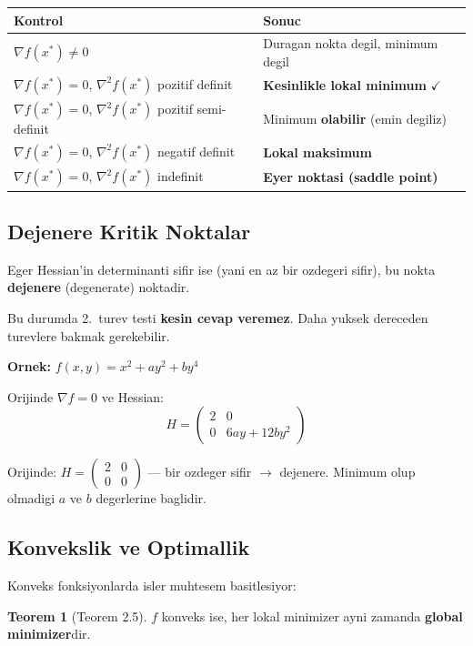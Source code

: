 \documentclass[12pt,a4paper]{article}
\theoremstyle{definition}
\newtheorem{teorem}{Teorem}[section]
\theoremstyle{remark}
\begin{document}
\begin{center}
\begin{tabular}{@{}ll@{}}
\toprule
\textbf{Kontrol} & \textbf{Sonuc} \\
\midrule
$\nabla f(x^*) \neq 0$ & Duragan nokta degil, minimum degil \\
$\nabla f(x^*) = 0$, $\nabla^2 f(x^*)$ pozitif definit & \textbf{Kesinlikle lokal minimum} $\checkmark$ \\
$\nabla f(x^*) = 0$, $\nabla^2 f(x^*)$ pozitif semi-definit & Minimum \textbf{olabilir} (emin degiliz) \\
$\nabla f(x^*) = 0$, $\nabla^2 f(x^*)$ negatif definit & \textbf{Lokal maksimum} \\
$\nabla f(x^*) = 0$, $\nabla^2 f(x^*)$ indefinit & \textbf{Eyer noktasi (saddle point)} \\
\bottomrule
\end{tabular}
\end{center}

\subsection{Dejenere Kritik Noktalar}

Eger Hessian'in determinanti sifir ise (yani en az bir ozdegeri sifir), bu nokta \textbf{dejenere} (degenerate) noktadir.

Bu durumda 2.\ turev testi \textbf{kesin cevap veremez}. Daha yuksek dereceden turevlere bakmak gerekebilir.

\textbf{Ornek:} $f(x,y) = x^2 + ay^2 + by^4$

Orijinde $\nabla f = 0$ ve Hessian:
\[
H = \begin{pmatrix} 2 & 0 \\ 0 & 6ay + 12by^2 \end{pmatrix}
\]

Orijinde: $H = \begin{pmatrix} 2 & 0 \\ 0 & 0 \end{pmatrix}$ --- bir ozdeger sifir $\rightarrow$ dejenere. Minimum olup olmadigi $a$ ve $b$ degerlerine baglidir.

\subsection{Konvekslik ve Optimallik}

Konveks fonksiyonlarda isler muhtesem basitlesiyor:

\begin{teorem}[Teorem 2.5]
$f$ konveks ise, her lokal minimizer ayni zamanda \textbf{global minimizer}dir.
\end{teorem}
\end{document}
